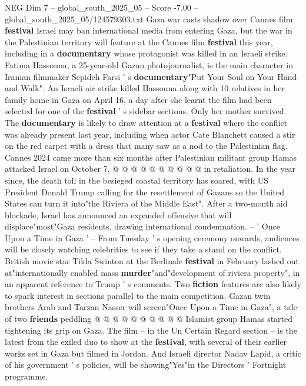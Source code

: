 \begin{textsample}{NEG Dim 7 – global\_south\_2025\_05 – Score -7.00 – global\_south\_2025\_05/124579303.txt}  \label{ex:f7_neg_211}
Gaza war casts shadow over Cannes film \textbf{festival} Israel may ban international media from entering Gaza, but the war in the Palestinian territory will feature at the Cannes film \textbf{festival} this year, including in a \textbf{documentary} whose protagonist was killed in an Israeli strike.
Fatima Hassouna, a 25-year-old Gazan photojournalist, is the main character in Iranian filmmaker Sepideh Farsi ' s \textbf{documentary}"Put Your Soul on Your Hand and Walk".
An Israeli air strike killed Hassouna along with 10 relatives in her family home in Gaza on April 16, a day after she learnt the film had been selected for one of the \textbf{festival} ' s sidebar sections.
Only her mother survived.
The \textbf{documentary} is likely to draw attention at a \textbf{festival} where the conflict was already present last year, including when actor Cate Blanchett caused a stir on the red carpet with a dress that many saw as a nod to the Palestinian flag.
Cannes 2024 came more than six months after Palestinian militant group Hamas attacked Israel on October 7, @ @ @ @ @ @ @ @ @ @ in retaliation.
In the year since, the death toll in the besieged coastal territory has soared, with US President Donald Trump calling for the resettlement of Gazans so the United States can turn it into"the Riviera of the Middle East".
After a two-month aid blockade, Israel has announced an expanded offensive that will displace"most"Gaza residents, drawing international condemnation. -- ' Once Upon a Time in Gaza ' -- From Tuesday ' s opening ceremony onwards, audiences will be closely watching celebrities to see if they take a stand on the conflict.
British movie star Tilda Swinton at the Berlinale \textbf{festival} in February lashed out at"internationally enabled mass \textbf{murder}"and"development of riviera property", in an apparent reference to Trump ' s comments.
Two \textbf{fiction} features are also likely to spark interest in sections parallel to the main competition.
Gazan twin brothers Arab and Tarzan Nasser will screen"Once Upon a Time in Gaza", a tale of two \textbf{friends} peddling @ @ @ @ @ @ @ @ @ @ Islamist group Hamas started tightening its grip on Gaza.
The film -- in the Un Certain Regard section -- is the latest from the exiled duo to show at the \textbf{festival}, with several of their earlier works set in Gaza but filmed in Jordan.
And Israeli director Nadav Lapid, a critic of his government ' s policies, will be showing"Yes"in the Directors ' Fortnight programme.

\end{textsample}
